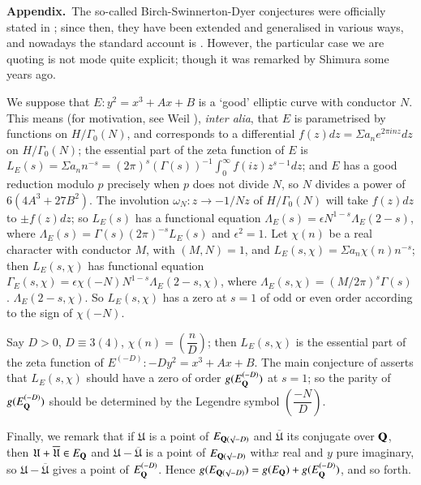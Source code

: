 \medskip
\noindent
{\bf Appendix.}~The so-called Birch-Swinnerton-Dyer conjectures were officially stated in \cite{art03-key2}; since then, they have been extended and generalised in various ways, and nowadays the standard account is \cite{art03-key8}. However, the particular case we are quoting is not mode quite explicit; though it was remarked by Shimura some years ago.

We suppose that $E:y^{2}=x^{3}+Ax+B$ is a `good' elliptic curve with conductor $N$. This means (for motivation, see Weil \cite{art03-key10}), {\em inter alia}, that $E$ is parametrised by functions on $H/\Gamma_{0}(N)$, and corresponds to a differential $f(z)dz=\Sigma a_{n}e^{2\pi inz}dz$ on $H/\Gamma_{0}(N)$; the essential part of the zeta function of $E$ is $L_{E}(s)=\Sigma a_{n}n^{-s}=(2\pi)^{s}(\Gamma(s))^{-1}\int^{\infty}_{0}f(iz)z^{s-1}dz$; and $E$ has a good reduction modulo $p$ precisely when $p$ does not divide $N$, so $N$ divides a power of $6(4 A^{3}+27B^{2})$. The involution $\omega_{N}:z\to -1/Nz$ of $H/\Gamma_{0}(N)$ will take $f(z)dz$ to $\pm f(z)dz$; so $L_{E}(s)$ has a functional equation $\Lambda_{E}(s)=\epsilon N^{1-s}\Lambda_{E}(2-s)$, where $\Lambda_{E}(s)=\Gamma(s)(2\pi)^{-s}L_{E}(s)$ and $\epsilon^{2}=1$. Let $\chi(n)$ be a real character with conductor $M$, with $(M,N)=1$, and $L_{E}(s,\chi)=\Sigma a_{n}\chi(n)n^{-s}$; then $L_{E}(s,\chi)$ has functional equation $\Gamma_{E}(s,\chi)=\epsilon \chi(-N)N^{1-s}\Lambda_{E}(2-s,\chi)$, where $\Lambda_{E}(s,\chi)=(M/2\pi)^{s}\Gamma(s)$. $\Lambda_{E}(2-s,\chi)$. So $L_{E}(s,\chi)$ has a zero at $s=1$ of odd or even order according to the sign of $\chi(-N)$.

Say $D>0$, $D\equiv 3(4)$, $\chi(n)=\left(\dfrac{n}{D}\right)$; then $L_{E}(s,\chi)$ is the essential part of the zeta function of $E^{(-D)}:-Dy^{2}=x^{3}+Ax+B$. The main conjecture of \cite{art03-key2} asserts that $L_{E}(s,\chi)$ should have a zero of order $g(E^{(-D)}_{\mathbf{Q}})$ at $s=1$; so the parity of $g(E^{(-D)}_{\mathbf{Q}})$ should be determined by the Legendre symbol $\left(\dfrac{-N}{D}\right)$.

Finally, we remark that if $\mathfrak{U}$ is a point of $E_{\mathbf{Q}(\surd-D)}$ and $\overline{\mathfrak{U}}$ its conjugate over $\mathbf{Q}$, then $\mathfrak{U}+\overline{\mathfrak{U}}\in E_{\mathbf{Q}}$ and $\mathfrak{U}-\overline{\mathfrak{U}}$ is a point of $E_{\mathbf{Q}(\surd-D)}$ with\pageoriginale $x$ real and $y$ pure imaginary, so $\mathfrak{U}-\overline{\mathfrak{U}}$ gives a point of $E_{\mathbf{Q}}^{(-D)}$. Hence $g(E_{\mathbf{Q}(\surd-D)})=g(E_{\mathbf{Q}})+g(E_{\mathbf{Q}}^{(-D)})$, and so forth.

